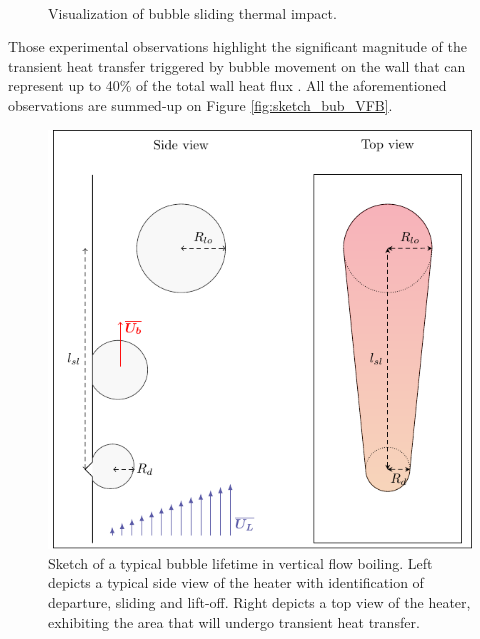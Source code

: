 \begin{figure}[H]

\begin{center}
\\
\end{center}

\caption{Visualization of bubble sliding thermal impact.}
\label{fig:slide_thermal_exp}
\end{figure}


Those experimental observations highlight the significant magnitude of the transient heat transfer triggered by bubble movement on the wall that can represent up to 40\% of the total wall heat flux \cite{kossolapov_experimental_2021}. All the aforementioned observations are summed-up on Figure \ref{fig:sketch_bub_VFB}. 

\begin{figure}[h!]
\centering
\includegraphics[width=0.65\linewidth]{img/forces/bub_life_VFB.pdf}
\caption{Sketch of a typical bubble lifetime in vertical flow boiling. Left depicts a typical side view of the heater with identification of departure, sliding and lift-off. Right depicts a top view of the heater, exhibiting the area that will undergo transient heat transfer.}
\label{fig:skecth_bub_VFB}
\end{figure}

